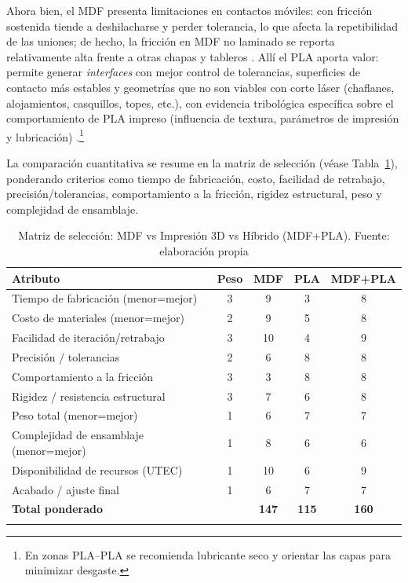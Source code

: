 \vspace{1em}

Ahora bien, el MDF presenta limitaciones en contactos móviles: con fricción sostenida tiende a deshilacharse y perder tolerancia, lo que afecta la repetibilidad de las uniones; de hecho, la fricción en MDF no laminado se reporta relativamente alta frente a otras chapas y tableros \cite{kukla_woodresearch_2021_mdf_friction}. Allí el PLA aporta valor: permite generar \emph{interfaces} con mejor control de tolerancias, superficies de contacto más estables y geometrías que no son viables con corte láser (chaflanes, alojamientos, casquillos, topes, etc.), con evidencia tribológica específica sobre el comportamiento de PLA impreso (influencia de textura, parámetros de impresión y lubricación) \cite{asme_pla_friction_2022}.\footnote{En zonas PLA–PLA se recomienda lubricante seco y orientar las capas para minimizar desgaste.}

\vspace{1em}

La comparación cuantitativa se resume en la matriz de selección (véase Tabla~\ref{tab:matriz_materiales}), ponderando criterios como tiempo de fabricación, costo, facilidad de retrabajo, precisión/tolerancias, comportamiento a la fricción, rigidez estructural, peso y complejidad de ensamblaje. 



\begin{table}[H]
\centering
\caption{Matriz de selección: MDF vs Impresión 3D vs Híbrido (MDF+PLA). Fuente: elaboración propia}
\begin{tabular}{lcccc}
\toprule
\textbf{Atributo} & \textbf{Peso} & \textbf{MDF} & \textbf{PLA} & \textbf{MDF+PLA} \\
\midrule
Tiempo de fabricación (menor=mejor) & 3 & 9 & 3 & 8 \\
Costo de materiales (menor=mejor)   & 2 & 9 & 5 & 8 \\
Facilidad de iteración/retrabajo    & 3 & 10 & 4 & 9 \\
Precisión / tolerancias              & 2 & 6 & 8 & 8 \\
Comportamiento a la fricción         & 3 & 3 & 8 & 8 \\
Rigidez / resistencia estructural    & 3 & 7 & 6 & 8 \\
Peso total (menor=mejor)             & 1 & 6 & 7 & 7 \\
Complejidad de ensamblaje (menor=mejor) & 1 & 8 & 6 & 6 \\
Disponibilidad de recursos (UTEC)    & 1 & 10 & 6 & 9 \\
Acabado / ajuste final               & 1 & 6 & 7 & 7 \\
\midrule
\textbf{Total ponderado}             &    & \textbf{147} & \textbf{115} & \textbf{160} \\
\bottomrule
\label{tab:matriz_materiales}
\end{tabular}
\end{table}


